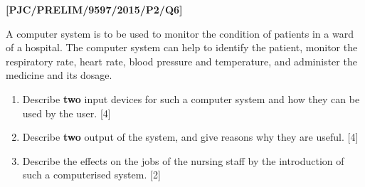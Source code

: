 \item \textbf{{[}PJC/PRELIM/9597/2015/P2/Q6{]} }

A computer system is to be used to monitor the condition of patients
in a ward of a hospital. The computer system can help to identify
the patient, monitor the respiratory rate, heart rate, blood pressure
and temperature, and administer the medicine and its dosage. 
\begin{enumerate}
\item Describe \textbf{two} input devices for such a computer system and
how they can be used by the user. \hfill{}{[}4{]}
\item Describe \textbf{two} output of the system, and give reasons why they
are useful. \hfill{} {[}4{]}
\item Describe the effects on the jobs of the nursing staff by the introduction
of such a computerised system. \hfill{} {[}2{]}
\end{enumerate}